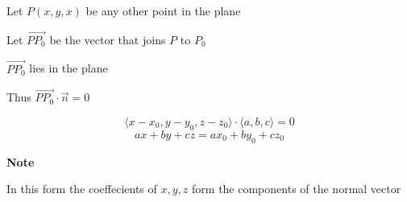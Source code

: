 \documentclass{article}
\begin{document}
Let \(P(x,y,x)\) be any other point in the plane

Let \(\overrightarrow{PP_0}\) be the vector that joins \(P\) to \(P_0\)

\(\overrightarrow{PP_0}\) lies in the plane

Thus \(\overrightarrow{PP_0} \cdot \vec{n} = 0\)

\[
\langle x - x_0, y-y_0,z-z_0 \rangle \cdot \langle a,b,c \rangle = 0
\]
\[
ax+by+cz = ax_0 + by_0 +cz_0
\]

\textbf{Note}

In this form the coeffecients of \(x,y,z\) form the components of the normal vector
\end{document}

